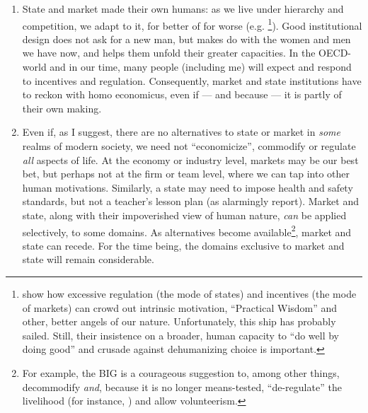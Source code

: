 \documentclass[11pt,a4paper,oneside,openright]{article}
\begin{document}
\begin{enumerate}
\begin{enumerate}
		\item State and market made their own humans: as we live under hierarchy and competition, we adapt to it, for better of for worse (e.g. \citealt{Schwartz2010}\footnote
			{\cite{Schwartz2010} show how excessive regulation (the mode of states) and incentives (the mode of markets) can crowd out intrinsic motivation, ``Practical Wisdom'' and other, better angels of our nature. Unfortunately, this ship has probably sailed. Still, their insistence on a broader, human capacity to ``do well by doing good'' and crusade against dehumanizing choice is important.}). 
		Good institutional design does not ask for a new man, but makes do with the women and men we have now, and helps them unfold their greater capacities. In the \gls{OECD}-world and in our time, many people (including me) will expect and respond to incentives and regulation. Consequently, market and state institutions have to reckon with homo economicus, even if --- and because --- it is partly of their own making.
		
		\item Even if, as I suggest, there are no alternatives to state or market in \emph{some} realms of modern society, we need not ``economicize'', commodify or regulate \emph{all} aspects of life. At the economy or industry level, markets may be our best bet, but perhaps not at the firm or team level, where we can tap into other human motivations. Similarly, a state may need to impose health and safety standards, but not a teacher's lesson plan (as \citeauthor{Schwartz2010} alarmingly report). Market and state, along with their impoverished view of human nature, \emph{can} be applied selectively, to some domains. As alternatives become available\footnote
			{For example, the \gls{BIG} is a courageous suggestion to, among other things, decommodify \emph{and}, because it is no longer means-tested, ``de-regulate'' the livelihood (for instance, \citealt{Offe2009}) and allow volunteerism.}, 
		market and state can recede. For the time being, the domains exclusive to market and state will remain considerable. 
		

\end{enumerate}
\end{enumerate}
\end{document}
